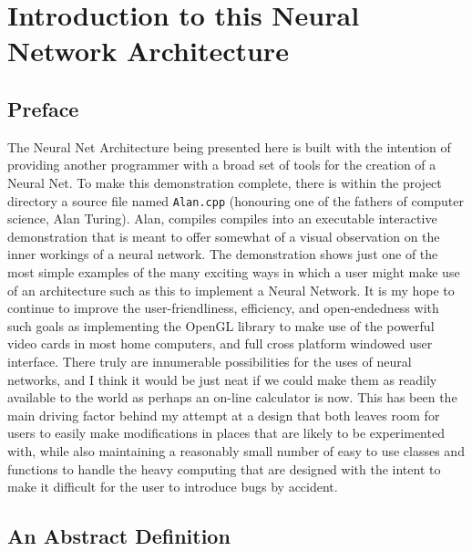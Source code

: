 \documentclass[a4paper,10pt]{article}
\begin{document}
\large\tableofcontents
\newpage\normalsize

 


\section{Introduction to this Neural Network Architecture}

\subsection{Preface}

The Neural Net Architecture being presented here is built with the intention of providing another programmer with a
broad set of tools for the creation of a Neural Net. To make this demonstration complete, there is within the project
directory a source file named \texttt{Alan.cpp} (honouring one of the fathers of computer science, Alan Turing).
Alan, compiles compiles into an executable interactive demonstration that is meant to offer somewhat of a visual
observation on the inner workings of a neural network.  The demonstration shows just one of the most simple examples of
the many exciting ways in which a user might make use of an architecture such as this to implement a Neural Network.
It is my hope to continue to improve the user-friendliness, efficiency, and open-endedness with such goals as
implementing the OpenGL library to make use of the powerful video cards in most home computers, and full cross platform
windowed user interface. There truly are innumerable possibilities for the uses of neural networks, and I think it would
be just neat if we could make them as readily available to the world as perhaps an on-line calculator is now. This has
been the main driving factor behind my attempt at a design that both leaves room for users to easily make modifications
in places that are likely to be experimented with, while also maintaining a reasonably small number of easy to use
classes and functions to handle the heavy computing that are designed with the intent to make it difficult for the user
to introduce bugs by accident.

\subsection{An Abstract Definition}
\end{document}
